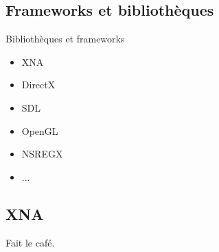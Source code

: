 \subsection{Frameworks et bibliothèques}
\begin{frame}
  \begin{block}{Bibliothèques et frameworks}
    \begin{itemize}
      \item XNA
      \item DirectX
      \item SDL
      \item OpenGL
      \item NSREGX
      \item ...
    \end{itemize}
  \end{block}
\end{frame}

\subsection{XNA}

\begin{frame}
  Fait le café.
\end{frame}
